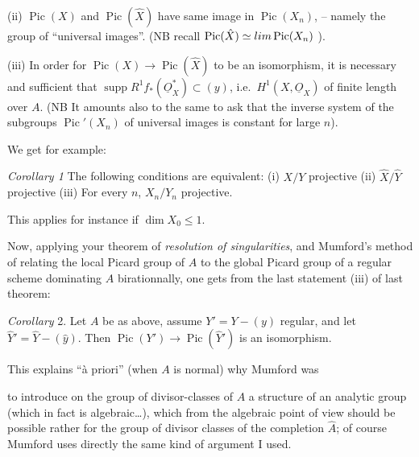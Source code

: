 \documentclass[11pt,a4paper]{article}
\begin{document}
(ii) $\operatorname{Pic}(X)$ and $\operatorname{Pic}(\hat{X})$ have same image
in $\operatorname{Pic}(X_n)$, -- namely the group of “universal images”.
(NB recall $\operatorname{Pic}(\hat{X}) \simeq \varprojlim \operatorname{Pic}(X_n)$ ).

(iii) In order for $\operatorname{Pic}(X) \to \operatorname{Pic}(\hat{X})$ to be
an isomorphism, it is necessary and sufficient that
$\operatorname{supp} R^1 f_*(\underline{O}_X^{*}) \subset (y)$, i.e.\
$H^1(X, \underline{O}_X)$ of finite length over $A$. (NB It amounts also to
the same to ask that the inverse system of the subgroups
$\operatorname{Pic}'(X_n)$ of universal images is constant for large $n$).

We get for example:

\emph{Corollary 1} The following conditions are equivalent: (i) $X/Y$
projective (ii) $\hat{X}/\hat{Y}$ projective (iii) For every $n$, $X_n/Y_n$
projective.

This applies for instance if $\dim X_0 \leqslant 1$.

Now, applying your theorem of \emph{resolution of singularities}, and
Mumford's method of relating the local Picard group of $A$ to the global
Picard group of a regular scheme dominating $A$ birationnally, one gets from
the last statement (iii) of last theorem:

\emph{Corollary} 2. Let $A$ be as above, assume \struck{\ill{}}
$Y' = Y - (y)$ regular, and let $\hat{Y}' = \hat{Y} - (\hat{y})$. Then
$\operatorname{Pic}(Y') \to \operatorname{Pic}(\hat{Y}')$ is an isomorphism.

This explains “à priori” (when $A$ is normal) why Mumford was

 to introduce \struck{\ill{}} on the group of divisor-classes of $A$
a structure of an analytic group (which in fact is algebraic…), which from
the algebraic point of view should be possible rather for the group of divisor
classes of the completion $\hat{A}$; of course Mumford uses directly the same
kind of argument I used.
\end{document}
